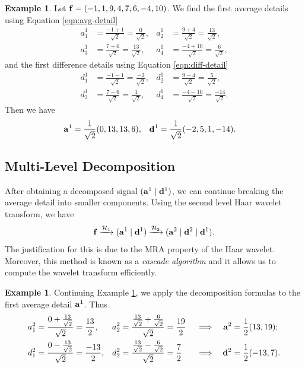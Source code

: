 \documentclass[12pt]{article}
\theoremstyle{definition}
\newtheorem{example}[definition]{Example}
\begin{document}
  \begin{example} \label{eg:decomp-1}
      Let \(\vb{f} = (-1, 1, 9, 4, 7, 6, -4, 10)\). We find the first average details using Equation \eqref{eqn:avg-detail}
      \begin{align*}
      a_1^1 &= \frac{-1+1}{\sqrt{2}} = \frac{0}{\sqrt{2}}, &
      a_2^1 &= \frac{9+4}{\sqrt{2}} = \frac{13}{\sqrt{2}},\\
      a_3^1 &= \frac{7+6}{\sqrt{2}} = \frac{13}{\sqrt{2}}, &
      a_4^1 &= \frac{-4+10}{\sqrt{2}} = \frac{6}{\sqrt{2}},
    \end{align*}
    and the first difference details using Equation \eqref{eqn:diff-detail}
    \begin{align*}
      d_1^1 &= \frac{-1-1}{\sqrt{2}} = \frac{-2}{\sqrt{2}}, &
      d_2^1 &= \frac{9-4}{\sqrt{2}} = \frac{5}{\sqrt{2}},\\
      d_3^1 &= \frac{7-6}{\sqrt{2}} = \frac{1}{\sqrt{2}}, &
      d_4^1 &= \frac{-4-10}{\sqrt{2}} = \frac{-14}{\sqrt{2}}.
    \end{align*}
    Then we have
    \begin{align*}
      \vb{a}^1 &= \frac{1}{\sqrt{2}}(0,13,13,6), &
      \vb{d}^1 &= \frac{1}{\sqrt{2}}(-2,5,1,-14).
    \end{align*}
  \end{example}

  \subsection{Multi-Level Decomposition}
  After obtaining a decomposed signal \((\vb{a}^1 \mid \vb{d}^1)\), we can continue breaking the average detail into smaller components. Using the second level Haar wavelet transform, we have
  \begin{equation*}
    \vb{f} \xrightarrow{\mathcal{H}_1} (\vb{a}^1 \mid \vb{d}^1) \xrightarrow{\mathcal{H}_2} (\vb{a}^2 \mid \vb{d}^2 \mid \vb{d}^1).
  \end{equation*}
  The justification for this is due to the MRA property of the Haar wavelet. Moreover, this method is known as a \textit{cascade algorithm} and it allows us to compute the wavelet transform efficiently. 

  \begin{example}
    Continuing Example \ref{eg:decomp-1}, we apply the decomposition formulas to the first average detail \(\vb{a}^1\). Thus
    \begin{align*}
      a_1^2 &= \frac{0 + \frac{13}{\sqrt{2}}}{\sqrt{2}} = \frac{13}{2}, &
      a_2^2 &= \frac{\frac{13}{\sqrt{2}} + \frac{6}{\sqrt{2}}}{\sqrt{2}} = \frac{19}{2} &
      &\implies&
      \vb{a}^2 &= \frac{1}{2}(13,19);\\
      d_1^2 &= \frac{0 - \frac{13}{\sqrt{2}}}{\sqrt{2}} = \frac{-13}{2}, &
      d_2^2 &= \frac{\frac{13}{\sqrt{2}} - \frac{6}{\sqrt{2}}}{\sqrt{2}} = \frac{7}{2} &
      &\implies&
      \vb{d}^2 &= \frac{1}{2}(-13,7).
    \end{align*}
  \end{example}
\end{document}
